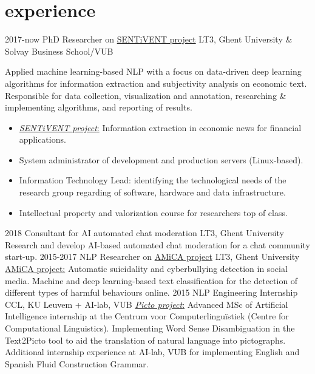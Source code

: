 \documentclass[]{friggeri-cv-a4}
\begin{document}
\section{experience}
\begin{entrylist}
    \entry
        {2017-now}
        {PhD Researcher on \href{https://www.lt3.ugent.be/projects/event-extraction-and-sentiment-analysis-for-financ/}{SENTiVENT project}}
        {LT3, Ghent University \& Solvay Business School/VUB}
        {Applied machine learning-based NLP with a focus on data-driven deep learning algorithms for information extraction and subjectivity analysis on economic text. Responsible for data collection, visualization and annotation, researching \& implementing algorithms, and reporting of results.
        \begin{itemize}
            \item \href{https://www.lt3.ugent.be/projects/event-extraction-and-sentiment-analysis-for-financ/}{\emph{SENTiVENT project}:} Information extraction in economic news for financial applications.
            \item System administrator of development and production servers (Linux-based).
            \item Information Technology Lead: identifying the technological needs of the research group regarding of software, hardware and data infrastructure.
            \item Intellectual property and valorization course for researchers top of class. %
        \end{itemize}}
    \entry
        {2018}
        {Consultant for AI automated chat moderation}
        {LT3, Ghent University}
        {Research and develop AI-based automated chat moderation for a chat community start-up.}
    \entry
        {2015-2017}
        {NLP Researcher on \href{http://amicaproject.be/}{AMiCA project}}
        {LT3, Ghent University}
        {\href{http://amicaproject.be/}{AMiCA project:} Automatic suicidality and cyberbullying detection in social media. Machine and deep learning-based text classification for the detection of different types of harmful behaviours online.}
    \entry
        {2015}
        {NLP Engineering Internship}
        {CCL, KU Leuvem + AI-lab, VUB}
        {\href{http://picto.ccl.kuleuven.be/}{\emph{Picto project}:} Advanced MSc of Artificial Intelligence internship at the Centrum voor Computerlinguïstiek (Centre for Computational Linguistics). Implementing Word Sense Disambiguation in the Text2Picto tool to aid the translation of natural language into pictographs. Additional internship experience at AI-lab, VUB for implementing English and Spanish Fluid Construction Grammar.}
\end{entrylist}
\end{document}
